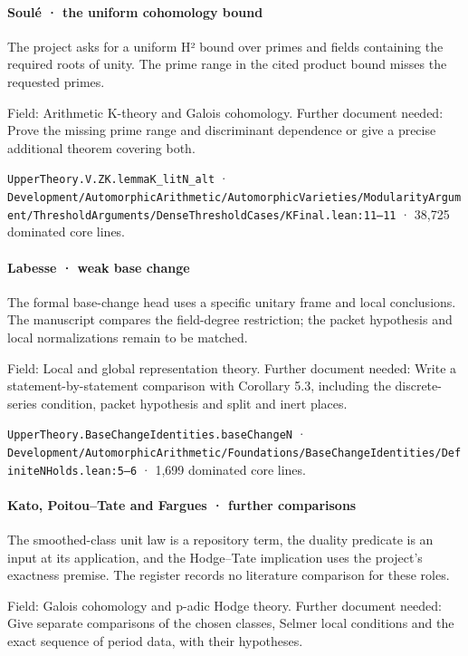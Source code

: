 \paragraph{Soulé · the uniform cohomology bound}

The project asks for a uniform H² bound over primes and fields containing the required roots of unity. The prime range in the cited product bound misses the requested primes.

Field: Arithmetic K-theory and Galois cohomology. Further document needed: Prove the missing prime range and discriminant dependence or give a precise additional theorem covering both.

\nolinkurl{UpperTheory.V.ZK.lemmaK_litN_alt} · \nolinkurl{Development/AutomorphicArithmetic/AutomorphicVarieties/ModularityArgument/ThresholdArguments/DenseThresholdCases/KFinal.lean:11–11} · 38,725 dominated core lines.

\paragraph{Labesse · weak base change}

The formal base-change head uses a specific unitary frame and local conclusions. The manuscript compares the field-degree restriction; the packet hypothesis and local normalizations remain to be matched.

Field: Local and global representation theory. Further document needed: Write a statement-by-statement comparison with Corollary 5.3, including the discrete-series condition, packet hypothesis and split and inert places.

\nolinkurl{UpperTheory.BaseChangeIdentities.baseChangeN} · \nolinkurl{Development/AutomorphicArithmetic/Foundations/BaseChangeIdentities/DefiniteNHolds.lean:5–6} · 1,699 dominated core lines.

\paragraph{Kato, Poitou–Tate and Fargues · further comparisons}

The smoothed-class unit law is a repository term, the duality predicate is an input at its application, and the Hodge–Tate implication uses the project’s exactness premise. The register records no literature comparison for these roles.

Field: Galois cohomology and p-adic Hodge theory. Further document needed: Give separate comparisons of the chosen classes, Selmer local conditions and the exact sequence of period data, with their hypotheses.


